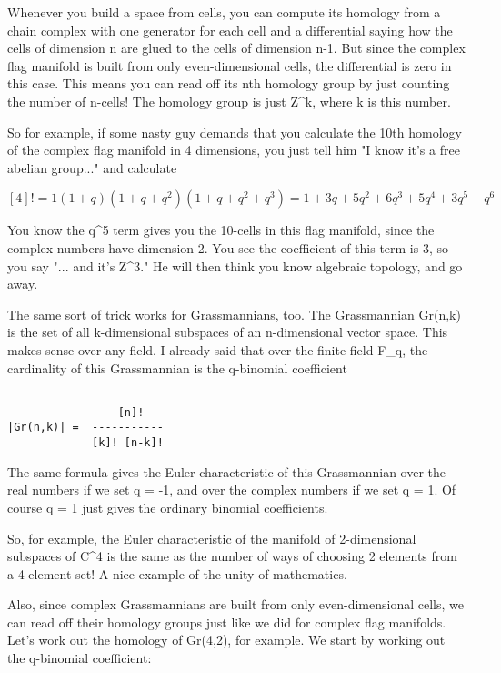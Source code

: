 Whenever you build a space from cells, you can compute its homology from
a chain complex with one generator for each cell and a differential
saying how the cells of dimension n are glued to the cells of dimension
n-1.   But since the complex flag manifold is built from only
even-dimensional cells, the differential is zero in this case.  This
means you can read off its nth homology group by just counting the
number of n-cells!  The homology group is just Z^{k}, 
where k is this number.

So for example, if some nasty guy demands that you calculate the 10th
homology of the complex flag manifold in 4 dimensions, you just tell
him "I know it's a free abelian group..." and calculate 


$$

[4]! = 1 (1 + q) (1 + q + q^{2}) (1 + q + q^{2} + q^{3}) 
     = 1 + 3q + 5q^{2} + 6q^{3} + 5q^{4} + 3q^{5} + q^{6}
$$
    
You know the q^{5} term gives you the 10-cells in this flag manifold,
since the complex numbers have dimension 2.  You see the coefficient of
this term is 3, so you say "... and it's Z^{3}."  He will then think you 
know algebraic topology, and go away.

The same sort of trick works for Grassmannians, too.  The Grassmannian
Gr(n,k) is the set of all k-dimensional subspaces of an n-dimensional
vector space.  This makes sense over any field.  I already said that over
the finite field F_{q}, the cardinality of this Grassmannian is the q-binomial
coefficient


\begin{verbatim}

                 [n]!
|Gr(n,k)| =  -----------
             [k]! [n-k]!
\end{verbatim}
    
The same formula gives the Euler characteristic of this Grassmannian
over the real numbers if we set q = -1, and over the complex numbers if
we set q = 1.  Of course q = 1 just gives the ordinary binomial coefficients.

So, for example, the Euler characteristic of the manifold of 2-dimensional
subspaces of C^{4} is the same as the number of ways of choosing 2 elements
from a 4-element set!  A nice example of the unity of mathematics.

Also, since complex Grassmannians are built from only even-dimensional cells,
we can read off their homology groups just like we did for complex flag
manifolds.  Let's work out the homology of Gr(4,2), for example.  We
start by working out the q-binomial coefficient:


